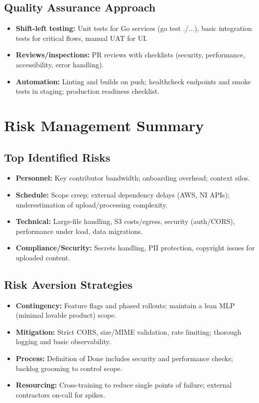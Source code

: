 \documentclass[12pt,a4paper]{article}
\begin{document}
\subsection{Quality Assurance Approach}
\begin{itemize}
\item \textbf{Shift-left testing:} Unit tests for Go services (go test ./...), basic integration tests for critical flows, manual UAT for UI.
\item \textbf{Reviews/inspections:} PR reviews with checklists (security, performance, accessibility, error handling).
\item \textbf{Automation:} Linting and builds on push; healthcheck endpoints and smoke tests in staging; production readiness checklist.
\end{itemize}

\section{Risk Management Summary}

\subsection{Top Identified Risks}
\begin{itemize}
\item \textbf{Personnel:} Key contributor bandwidth; onboarding overhead; context silos.
\item \textbf{Schedule:} Scope creep; external dependency delays (AWS, NI APIs); underestimation of upload/processing complexity.
\item \textbf{Technical:} Large-file handling, S3 costs/egress, security (auth/CORS), performance under load, data migrations.
\item \textbf{Compliance/Security:} Secrets handling, PII protection, copyright issues for uploaded content.
\end{itemize}

\subsection{Risk Aversion Strategies}
\begin{itemize}
\item \textbf{Contingency:} Feature flags and phased rollouts; maintain a lean MLP (minimal lovable product) scope.
\item \textbf{Mitigation:} Strict CORS, size/MIME validation, rate limiting; thorough logging and basic observability.
\item \textbf{Process:} Definition of Done includes security and performance checks; backlog grooming to control scope.
\item \textbf{Resourcing:} Cross-training to reduce single points of failure; external contractors on-call for spikes.
\end{itemize}
\end{document}
